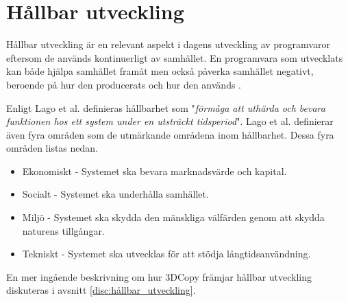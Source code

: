 \section{Hållbar utveckling}

Hållbar utveckling är en relevant aspekt i dagens utveckling av programvaror eftersom de används kontinuerligt av samhället. En programvara som utvecklats kan både hjälpa samhället framåt men också påverka samhället negativt, beroende på hur den producerats och hur den används \cite{raturi2014developing}.

Enligt Lago et al. \cite{lago2015framing} definieras hållbarhet som "\textit{förmåga att uthärda och bevara funktionen hos ett system under en utsträckt tidsperiod}". Lago et al. \cite{lago2015framing} definierar även fyra områden som de utmärkande områdena inom hållbarhet. Dessa fyra områden listas nedan.


	\begin{itemize}
		\item Ekonomiskt -  Systemet ska bevara marknadsvärde och kapital.
		\item Socialt - Systemet ska underhålla samhället.
		\item Miljö - Systemet ska skydda den mänskliga välfärden genom att skydda naturens tillgångar.
		\item Tekniskt - Systemet ska utvecklas för att stödja långtidsanvändning.
	\end{itemize}

En mer ingående beskrivning om hur 3DCopy främjar hållbar utveckling diskuteras i avsnitt \ref{disc:hållbar_utveckling}.


